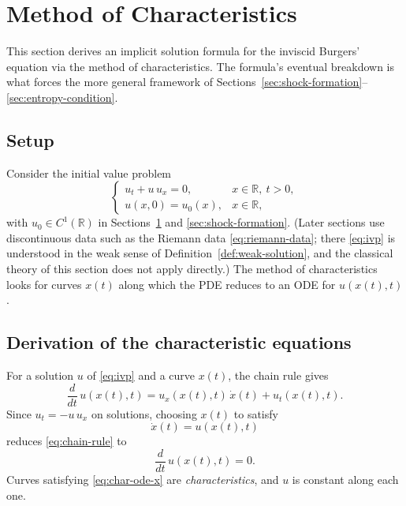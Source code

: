 
\section{Method of Characteristics}
\label{sec:characteristics}

This section derives an implicit solution formula for the inviscid
Burgers' equation via the method of characteristics. The formula's
eventual breakdown is what forces the more general framework of
Sections~\ref{sec:shock-formation}--\ref{sec:entropy-condition}.

\subsection{Setup}
\label{subsec:char-setup}

Consider the initial value problem
\begin{equation}
  \label{eq:ivp}
  \begin{cases}
    u_t + u\, u_x = 0, & x \in \mathbb{R},\ t > 0, \\
    u(x,0) = u_0(x), & x \in \mathbb{R},
  \end{cases}
\end{equation}
with $u_0 \in C^1(\mathbb{R})$ in Sections~\ref{sec:characteristics} and
\ref{sec:shock-formation}. (Later sections use discontinuous data such as
the Riemann data \eqref{eq:riemann-data}; there \eqref{eq:ivp} is
understood in the weak sense of Definition~\ref{def:weak-solution}, and
the classical theory of this section does not apply directly.) The method
of characteristics looks for curves $x(t)$ along which the PDE reduces to
an ODE for $u(x(t),t)$.

\subsection{Derivation of the characteristic equations}
\label{subsec:char-derivation}

For a solution $u$ of \eqref{eq:ivp} and a curve $x(t)$, the chain rule
gives
\begin{equation}
  \label{eq:chain-rule}
  \frac{d}{dt}\, u(x(t), t) = u_x(x(t),t)\, \dot{x}(t) + u_t(x(t),t).
\end{equation}
Since $u_t = -u\,u_x$ on solutions, choosing $x(t)$ to satisfy
\begin{equation}
  \label{eq:char-ode-x}
  \dot{x}(t) = u(x(t), t)
\end{equation}
reduces \eqref{eq:chain-rule} to
\begin{equation}
  \label{eq:char-ode-u}
  \frac{d}{dt}\, u(x(t), t) = 0.
\end{equation}
Curves satisfying \eqref{eq:char-ode-x} are \emph{characteristics}, and
$u$ is constant along each one.

